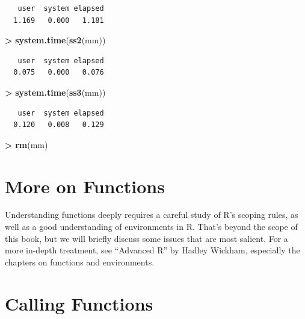 \documentclass[]{krantz}
\makeatletter
\newenvironment{Shaded}{\begin{snugshade}}{\end{snugshade}}
\newcommand{\KeywordTok}[1]{\textcolor[rgb]{0.27,0.27,0.27}{\textbf{#1}}}
\newcommand{\NormalTok}[1]{#1}
\newcommand{\OperatorTok}[1]{\textcolor[rgb]{0.43,0.43,0.43}{\textbf{#1}}}
\newcommand{\StringTok}[1]{\textcolor[rgb]{0.5,0.5,0.5}{#1}}
\newenvironment{kframe}{%
\medskip{}
\setlength{\fboxsep}{.8em}
 \def\at@end@of@kframe{}%
 \ifinner\ifhmode%
  \def\at@end@of@kframe{\end{minipage}}%
  \begin{minipage}{\columnwidth}%
 \fi\fi%
 \def\FrameCommand##1{\hskip\@totalleftmargin \hskip-\fboxsep
 \colorbox{shadecolor}{##1}\hskip-\fboxsep
     \hskip-\linewidth \hskip-\@totalleftmargin \hskip\columnwidth}%
 \MakeFramed {\advance\hsize-\width
   \@totalleftmargin\z@ \linewidth\hsize
   \@setminipage}}%
 {\par\unskip\endMakeFramed%
 \at@end@of@kframe}
\renewenvironment{Shaded}{\begin{kframe}}{\end{kframe}}
\makeatother
\begin{document}
\begin{verbatim}
   user  system elapsed 
  1.169   0.000   1.181 
\end{verbatim}

\begin{Shaded}
\begin{Highlighting}[]
\OperatorTok{>}\StringTok{ }\KeywordTok{system.time}\NormalTok{(}\KeywordTok{ss2}\NormalTok{(mm))}
\end{Highlighting}
\end{Shaded}

\begin{verbatim}
   user  system elapsed 
  0.075   0.000   0.076 
\end{verbatim}

\begin{Shaded}
\begin{Highlighting}[]
\OperatorTok{>}\StringTok{ }\KeywordTok{system.time}\NormalTok{(}\KeywordTok{ss3}\NormalTok{(mm))}
\end{Highlighting}
\end{Shaded}

\begin{verbatim}
   user  system elapsed 
  0.120   0.008   0.129 
\end{verbatim}

\begin{Shaded}
\begin{Highlighting}[]
\OperatorTok{>}\StringTok{ }\KeywordTok{rm}\NormalTok{(mm)}
\end{Highlighting}
\end{Shaded}

\hypertarget{more-on-functions}{%
\section{More on Functions}\label{more-on-functions}}

Understanding functions deeply requires a careful study of R's scoping rules, as well as a good understanding of environments in R. That's beyond the scope of this book, but we will briefly discuss some issues that are most salient. For a more in-depth treatment, see ``Advanced R'' by Hadley Wickham, especially the chapters on functions and environments.

\hypertarget{calling-functions}{%
\section{Calling Functions}\label{calling-functions}}
\end{document}
